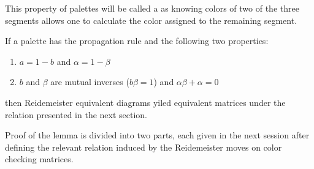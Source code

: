     This property of palettes will be called a  as knowing colors of two of the three segments allows one to calculate the color assigned to the remaining segment.

    \begin{lemma}\label{warunki na palete}
  If a palette has the propagation rule and the following two properties:
  \begin{enumerate}
    \item $a=1-b$ and $\alpha=1-\beta$
    \item $b$ and $\beta$ are mutual inverses ($b\beta=1$) and $\alpha\beta+\alpha=0$
  \end{enumerate}
    then Reidemeister equivalent diagrams yiled equivalent matrices under the relation presented in the next section.
\end{lemma}

Proof of the lemma is divided into two parts, each given in the next session after defining the relevant relation induced by the Reidemeister moves on color checking matrices.
